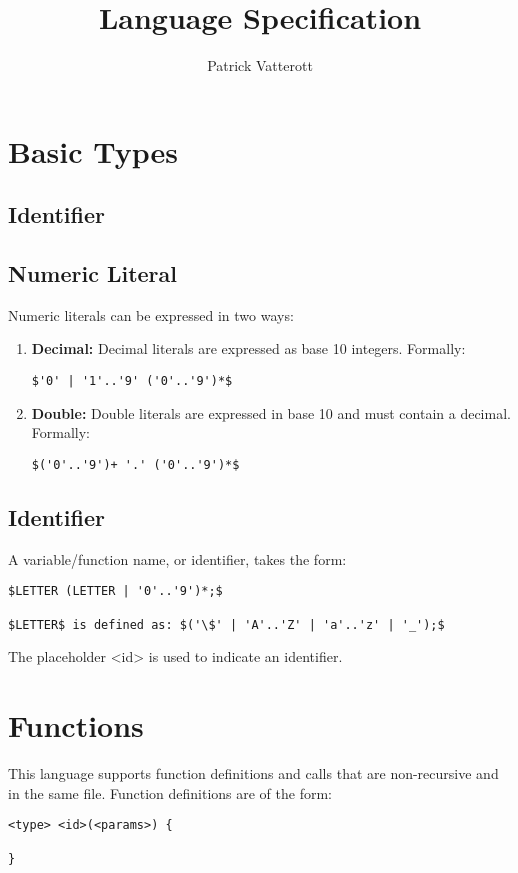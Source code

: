 \documentclass[11pt, oneside]{article}   	%
\title{Language Specification}
\author{Patrick Vatterott}
\begin{document}
\maketitle
\section{Basic Types}
\subsection{Identifier}


\subsection{Numeric Literal}
Numeric literals can be expressed in two ways:
\begin{enumerate}[1)]
\item 
\textbf{Decimal:} Decimal literals are expressed as base 10 integers. Formally: 
\begin{lstlisting}
$'0' | '1'..'9' ('0'..'9')*$
\end{lstlisting}
\item 
\textbf{Double:} Double literals are expressed in base 10 and must contain a decimal. Formally: 
\begin{lstlisting}
$('0'..'9')+ '.' ('0'..'9')*$
\end{lstlisting}
\end{enumerate}

\subsection{Identifier}
A variable/function name, or identifier, takes the form:

\begin{lstlisting}
$LETTER (LETTER | '0'..'9')*;$ 

$LETTER$ is defined as: $('\$' | 'A'..'Z' | 'a'..'z' | '_');$
\end{lstlisting}

The placeholder <id> is used to indicate an identifier.

\section{Functions}
This language supports function definitions and calls that are non-recursive and in the same file.
Function definitions are of the form:

\begin{lstlisting}
<type> <id>(<params>) {

}
\end{lstlisting}
\end{document}
